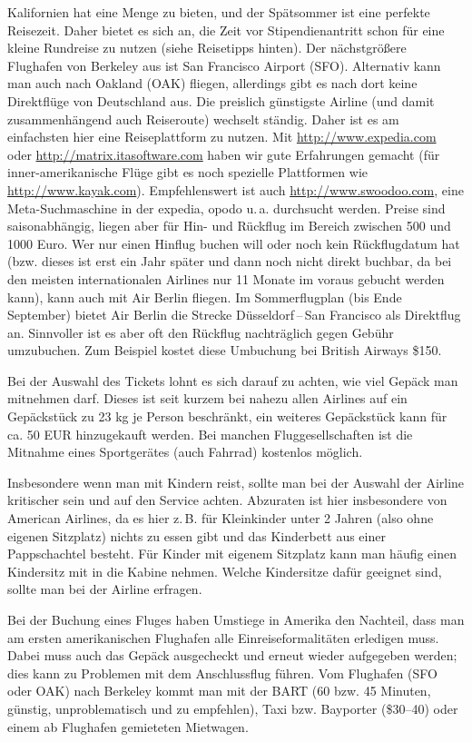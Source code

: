 \documentclass[a4paper]{scrreprt}
\begin{document}
Kalifornien hat eine Menge zu bieten, und der Spätsommer ist eine perfekte Reisezeit.
Daher bietet es sich an, die Zeit vor Stipendienantritt schon für eine kleine Rundreise zu nutzen (siehe Reisetipps hinten). Der nächstgrößere Flughafen von Berkeley aus ist San Francisco Airport (SFO). Alternativ kann man auch nach Oakland (OAK) fliegen, allerdings gibt es nach dort keine Direktflüge von Deutschland aus. Die preislich günstigste Airline (und damit zusammenhängend auch Reiseroute) wechselt ständig. Daher ist es am einfachsten hier eine Reiseplattform zu nutzen. Mit \url{http://www.expedia.com} oder \url{http://matrix.itasoftware.com} haben wir gute Erfahrungen gemacht (für inner-amerikanische Flüge gibt es noch spezielle Plattformen wie  \url{http://www.kayak.com}). Empfehlenswert ist auch  \url{http://www.swoodoo.com}, eine Meta-Suchmaschine in der expedia, opodo u.\,a. durchsucht werden. Preise sind saisonabhängig, liegen aber für Hin- und Rückflug im Bereich zwischen 500 und 1000 Euro. Wer nur einen Hinflug buchen will oder noch kein Rückflugdatum hat (bzw. dieses ist erst ein Jahr später und dann noch nicht direkt buchbar, da bei den meisten internationalen Airlines nur 11 Monate im voraus gebucht werden kann), kann auch mit Air Berlin fliegen. Im Sommerflugplan (bis Ende September) bietet Air Berlin die Strecke Düsseldorf\,--\,San Francisco als Direktflug an. Sinnvoller ist es aber oft den Rückflug nachträglich gegen Gebühr umzubuchen. Zum Beispiel kostet diese Umbuchung bei British Airways \$150. 

Bei der Auswahl des Tickets lohnt es sich darauf zu achten, wie viel Gepäck man mitnehmen darf. Dieses ist seit kurzem bei nahezu allen Airlines auf ein Gepäckstück zu 23 kg je Person beschränkt, ein weiteres Gepäckstück kann für ca. 50 EUR hinzugekauft werden. Bei manchen Fluggesellschaften ist die Mitnahme eines Sportgerätes (auch Fahrrad) kostenlos möglich.

Insbesondere wenn man mit Kindern reist, sollte man bei der Auswahl der Airline kritischer sein und auf den Service achten. Abzuraten ist hier insbesondere von American Airlines, da es hier z.\,B. für Kleinkinder unter 2 Jahren (also ohne eigenen Sitzplatz) nichts zu essen gibt und das Kinderbett aus einer Pappschachtel besteht.
Für Kinder mit eigenem Sitzplatz kann man häufig einen Kindersitz mit in die Kabine nehmen.
Welche Kindersitze dafür geeignet sind, sollte man bei der Airline erfragen.

Bei der Buchung eines Fluges haben Umstiege in Amerika den Nachteil, dass man am ersten amerikanischen Flughafen alle Einreiseformalitäten erledigen muss. Dabei muss auch das Gepäck ausgecheckt und erneut wieder aufgegeben werden; dies kann zu Problemen mit dem Anschlussflug führen. Vom Flughafen (SFO oder OAK) nach Berkeley kommt man mit der BART (60 bzw. 45 Minuten, günstig, unproblematisch und zu empfehlen), Taxi bzw. Bayporter (\$30--40) oder einem ab Flughafen gemieteten Mietwagen.
 
\end{document}
